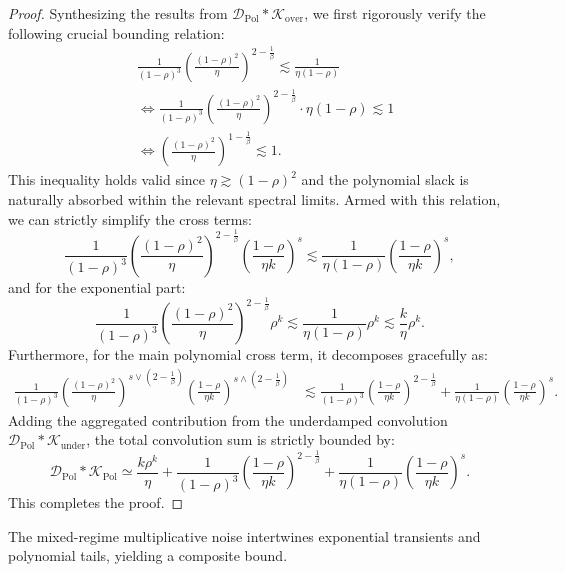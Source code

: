 \begin{proof}
Synthesizing the results from $\mathcal{D}_{\mathrm{Pol}} * \mathcal{K}_{\mathrm{over}}$, we first rigorously verify the following crucial bounding relation:
\begin{align*}
    &\frac{1}{(1-\rho)^3} \left(\frac{(1-\rho)^2}{\eta}\right)^{2-\frac{1}{\beta}} \lesssim \frac{1}{\eta(1-\rho)} \\
    & \Leftrightarrow \frac{1}{(1-\rho)^3} \left(\frac{(1-\rho)^2}{\eta}\right)^{2-\frac{1}{\beta}} \cdot \eta(1-\rho) \lesssim 1 \\
    & \Leftrightarrow \left(\frac{(1-\rho)^2}{\eta}\right)^{1-\frac{1}{\beta}} \lesssim 1.
\end{align*}
This inequality holds valid since $\eta \gtrsim (1-\rho)^2$ and the polynomial slack is naturally absorbed within the relevant spectral limits. Armed with this relation, we can strictly simplify the cross terms:
\[
    \frac{1}{(1-\rho)^3} \left(\frac{(1-\rho)^2}{\eta}\right)^{2-\frac{1}{\beta}} \left(\frac{1-\rho}{\eta k}\right)^s \lesssim \frac{1}{\eta(1-\rho)} \left(\frac{1-\rho}{\eta k}\right)^s,
\]
and for the exponential part:
\[
    \frac{1}{(1-\rho)^3} \left(\frac{(1-\rho)^2}{\eta}\right)^{2-\frac{1}{\beta}} \rho^k \lesssim \frac{1}{\eta(1-\rho)} \rho^k \lesssim \frac{k}{\eta} \rho^k.
\]
Furthermore, for the main polynomial cross term, it decomposes gracefully as:
\begin{align*}
    \frac{1}{(1-\rho)^3} \left(\frac{(1-\rho)^2}{\eta}\right)^{s \vee (2-\frac{1}{\beta})} \left(\frac{1-\rho}{\eta k}\right)^{s \wedge (2-\frac{1}{\beta})} 
    &\lesssim \frac{1}{(1-\rho)^3} \left(\frac{1-\rho}{\eta k}\right)^{2-\frac{1}{\beta}} + \frac{1}{\eta(1-\rho)} \left(\frac{1-\rho}{\eta k}\right)^s.
\end{align*}
Adding the aggregated contribution from the underdamped convolution $\mathcal{D}_{\mathrm{Pol}} * \mathcal{K}_{\mathrm{under}}$, the total convolution sum is strictly bounded by:
\begin{equation*}
    \mathcal{D}_{\mathrm{Pol}} * \mathcal{K}_{\mathrm{Pol}} \simeq \frac{k\rho^k}{\eta} + \frac{1}{(1-\rho)^3} \left(\frac{1-\rho}{\eta k}\right)^{2-\frac{1}{\beta}} + \frac{1}{\eta(1-\rho)} \left(\frac{1-\rho}{\eta k}\right)^s.
\end{equation*}
This completes the proof.
\end{proof}






The mixed-regime multiplicative noise intertwines exponential transients and polynomial tails, yielding a composite bound.

